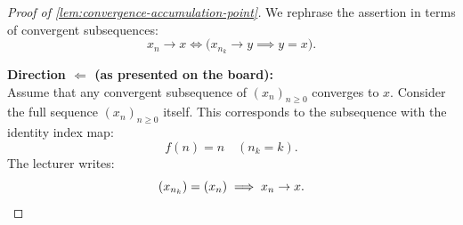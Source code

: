 \begin{content}
\begin{proof}[Proof of \cref{lem:convergence-accumulation-point}]
We rephrase the assertion in terms of convergent subsequences:
\begin{equation}\label{eq:rephrased-lemma}
x_n \to x \iff \bigl(x_{n_k} \to y \implies y = x\bigr).
\end{equation}

\textbf{Direction \texorpdfstring{$\Longleftarrow$}{<=} (as presented on the board):} \\
Assume that any convergent subsequence of $(x_n)_{n \ge 0}$ converges to $x$.
Consider the full sequence $(x_n)_{n \ge 0}$ itself. This corresponds to the subsequence with the identity index map:
\[
f(n) = n \quad (n_k = k).
\]
The lecturer writes:
\[
(x_{n_k}) = (x_n) \implies x_n \to x. \qedhere
\]
\end{proof}
\end{content}

\begin{hidden}
\end{hidden}

